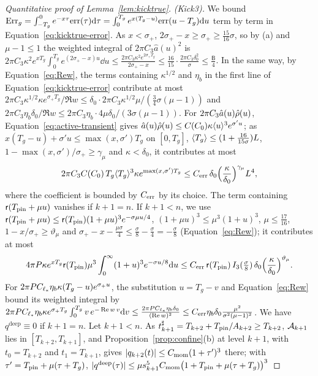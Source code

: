 \begin{proof}[Quantitative proof of Lemma~\ref{lem:kicktrue}]
\emph{(Kick3).} We bound
$\mathrm{Err}_g=\int_{-T_g}^0e^{-x\tau}\mathrm{err}(\tau)\dd\tau=\int_0^{T_g}e^{x(T_g-u)}\mathrm{err}(u-T_g)\dd u$
term by term in Equation~\eqref{eq:kicktrue-error}.
As $x<\sigma_+$, $2\sigma_+-x\ge\sigma_+\ge\frac{15}{16}\sigma$, so by
(a) and $\mu-1\le1$ the weighted integral of $2\pi C_3\hat a(u)^2$ is
$2\pi C_3\kappa^2e^{xT_g}\int_0^{T_g}e^{(2\sigma_+-x)u}\dd u\le\frac{2\pi C_3\kappa^2e^{2\sigma_+T_g}}{2\sigma_+-x}
\le\frac{16}{15}\cdot\frac{2\pi C_3\delta_0^2}{\sigma}\le\frac{\mathsf B}4$.
In the same way, by Equation~\eqref{eq:Rew}, the terms containing
$\kappa^{1/2}$ and $\eta_b$ in the first line of Equation~\eqref{eq:kicktrue-error}
contribute at most
$2\pi C_3\kappa^{1/2}\kappa e^{\sigma_+T_g}/\Re w\le\delta_0\cdot2\pi C_3\kappa^{1/2}\mu/(\frac34\sigma(\mu-1))$
and $2\pi C_3\eta_b\delta_0/\Re w\le2\pi C_3\eta_b\cdot4\mu\delta_0/(3\sigma(\mu-1))$.
For $2\pi C_3\hat a(u)\hat\rho(u)$, Equation~\eqref{eq:active-transient} gives
$\hat a(u)\hat\rho(u)\le C(C_0)\kappa\langle u\rangle^3e^{\sigma'u}$; as
$x(T_g-u)+\sigma'u\le\max(x,\sigma')T_g$ on $[0,T_g]$,
$\langle T_g\rangle\le(1+\frac{16}{15\sigma})L$, $1-\max(x,\sigma')/\sigma_+\ge\gamma_\mu$ and
$\kappa<\delta_0$, it contributes at most
\[
2\pi C_3C(C_0)\,T_g\langle T_g\rangle^3\kappa e^{\max(x,\sigma')T_g}
\le C_{\mathrm{err}}\,\delta_0
\Big(\frac\kappa{\delta_0}\Big)^{\gamma_\mu}L^4,
\]
where the coefficient is bounded by $C_{\mathrm{err}}$ by its choice.
The term containing $\mathsf{r}(T_{\mathrm{pin}}+\mu u)$ vanishes if $k+1=n$. If $k+1<n$, we use
$\mathsf{r}(T_{\mathrm{pin}}+\mu u)\le\mathsf{r}(T_{\mathrm{pin}})(1+\mu u)^3e^{-\sigma\mu u/4}$,
$(1+\mu u)^3\le\mu^3(1+u)^3$, $\mu\le\frac{17}{16}$, $1-x/\sigma_+\ge\vartheta_\mu$ and
$\sigma_+-x-\frac{\mu\sigma}4\le\frac\sigma8-\frac\sigma4=-\frac\sigma8$
(Equation~\eqref{eq:Rew}); it contributes at most
\[
4\pi P\kappa e^{xT_g}\mathsf{r}(T_{\mathrm{pin}})\mu^3\int_0^{\infty}(1+u)^3e^{-\sigma u/8}\dd u
\le C_{\mathrm{err}}\,\mathsf{r}(T_{\mathrm{pin}})\,I_{3}(\tfrac\sigma8)\,\delta_0\Big(\frac\kappa{\delta_0}\Big)^{\vartheta_\mu}.
\]
For $2\pi PC_{\ell_*}\eta_b\kappa(T_g-u)e^{\sigma_+u}$, the substitution $u=T_g-v$
and Equation~\eqref{eq:Rew} bound its weighted integral by
$2\pi PC_{\ell_*}\eta_b\kappa e^{\sigma_+T_g}\allowbreak\int_0^{T_g}v\,e^{-\Re w\,v}\dd v
\le\frac{2\pi PC_{\ell_*}\eta_b\delta_0}{(\Re w)^2}
\le C_{\mathrm{err}}\eta_b\delta_0\frac{\mu^2}{\sigma^2(\mu-1)^2}$.
We have $q^{\mathrm{deep}}\equiv0$ if $k+1=n$. Let $k+1<n$. As
$t^\sharp_{k+1}=T_{k+2}+T_{\mathrm{pin}}/A_{k+2}\ge T_{k+2}$, $\mathcal{A}_{k+1}$ lies in
$[T_{k+2},T_{k+1}]$, and Proposition~\ref{prop:confine}(b) at level $k+1$,
with $t_0=T_{k+2}$ and $t_1=T_{k+1}$, gives $|q_{k+2}(t)|\le C_{\mathrm{mom}}(1+\tau')^3$
there; with $\tau'=T_{\mathrm{pin}}+\mu(\tau+T_g)$,
$|q^{\mathrm{deep}}(\tau)|\le\mu s_{k+1}^5C_{\mathrm{mom}}\big(1+T_{\mathrm{pin}}+\mu(\tau+T_g)\big)^3$

\end{proof}
